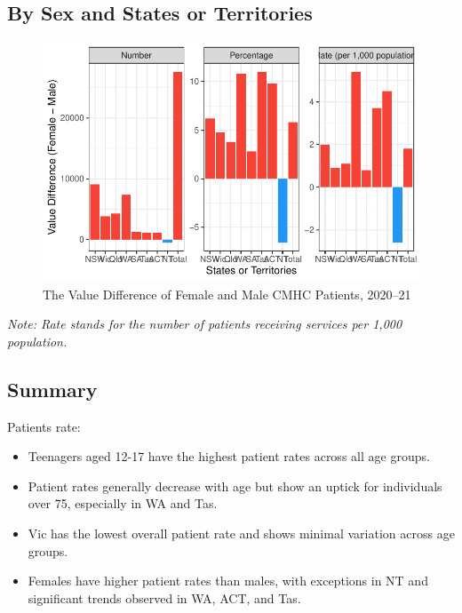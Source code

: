 \documentclass[
  a4paper,
  DIV=11,
  numbers=noendperiod]{scrreport}
\begin{document}
\hypertarget{by-sex-and-states-or-territories}{%
\subsection{By Sex and States or
Territories}\label{by-sex-and-states-or-territories}}

\begin{figure}

\caption{\label{fig-cmhc-ss}The Value Difference of Female and Male CMHC
Patients, 2020--21}

{\centering \includegraphics{./chap2-cmhc_files/figure-pdf/fig-cmhc-ss-1.pdf}

}

\end{figure}

\emph{Note: Rate stands for the number of patients receiving services
per 1,000 population.}

\hypertarget{summary-3}{%
\subsection{Summary}\label{summary-3}}

Patients rate:

\begin{itemize}
\item
  Teenagers aged 12-17 have the highest patient rates across all age
  groups.
\item
  Patient rates generally decrease with age but show an uptick for
  individuals over 75, especially in WA and Tas.
\item
  Vic has the lowest overall patient rate and shows minimal variation
  across age groups.
\item
  Females have higher patient rates than males, with exceptions in NT
  and significant trends observed in WA, ACT, and Tas.
\end{itemize}
\end{document}
